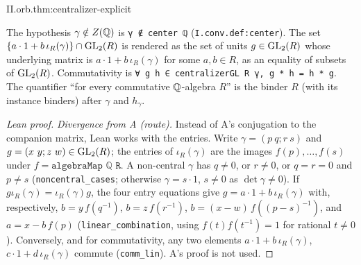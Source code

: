 \begin{theorem}
\end{theorem}
\begin{tfformal}{II.orb.thm:centralizer-explicit}
\begin{tffidelity}
The hypothesis $\gamma\notin Z(\mathbb{Q})$ is \texttt{γ ∉ center ℚ} (\texttt{I.conv.def:center}). The set $\{a\cdot1+b\,\iota_R(\gamma)\}\cap\mathrm{GL}_2(R)$ is rendered as the set of units $g\in\mathrm{GL}_2(R)$ whose underlying matrix is $a\cdot1+b\,\iota_R(\gamma)$ for some $a,b\in R$, as an equality of subsets of $\mathrm{GL}_2(R)$. Commutativity is \texttt{∀ g h ∈ centralizerGL R γ, g * h = h * g}. The quantifier ``for every commutative $\mathbb{Q}$-algebra $R$'' is the binder $R$ (with its instance binders) after $\gamma$ and $h_\gamma$.
\end{tffidelity}
\end{tfformal}
\begin{proof}[Lean proof]
\emph{Divergence from A (route).} Instead of A's conjugation to the companion matrix, Lean works with the entries. Write $\gamma=(p\ q;r\ s)$ and $g=(x\ y;z\ w)\in\mathrm{GL}_2(R)$; the entries of $\iota_R(\gamma)$ are the images $f(p),\dots,f(s)$ under $f=\texttt{algebraMap ℚ R}$. A non-central $\gamma$ has $q\ne0$, or $r\ne0$, or $q=r=0$ and $p\ne s$ (\texttt{noncentral\_cases}; otherwise $\gamma=s\cdot1$, $s\ne0$ as $\det\gamma\ne0$). If $g\iota_R(\gamma)=\iota_R(\gamma)g$, the four entry equations give $g=a\cdot1+b\,\iota_R(\gamma)$ with, respectively, $b=y\,f(q^{-1})$, $b=z\,f(r^{-1})$, $b=(x-w)\,f((p-s)^{-1})$, and $a=x-b\,f(p)$ (\texttt{linear\_combination}, using $f(t)f(t^{-1})=1$ for rational $t\ne0$). Conversely, and for commutativity, any two elements $a\cdot1+b\,\iota_R(\gamma)$, $c\cdot1+d\,\iota_R(\gamma)$ commute (\texttt{comm\_lin}). A's proof is not used.
\end{proof}


